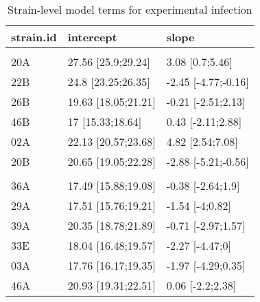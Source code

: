 \begin{table}

\caption{\label{tab:}Strain-level model terms for experimental infection}
\centering
\begin{tabular}[t]{lll}
\toprule
strain.id & intercept & slope\\
\midrule
\addlinespace[0.3em]
\multicolumn{3}{l}{\textbf{P. syringae}}\\
\hspace{1em}20A & 27.56 [25.9;29.24] & 3.08 [0.7;5.46]\\
\hspace{1em}22B & 24.8 [23.25;26.35] & -2.45 [-4.77;-0.16]\\
\hspace{1em}26B & 19.63 [18.05;21.21] & -0.21 [-2.51;2.13]\\
\hspace{1em}46B & 17 [15.33;18.64] & 0.43 [-2.11;2.88]\\
\hspace{1em}02A & 22.13 [20.57;23.68] & 4.82 [2.54;7.08]\\
\hspace{1em}20B & 20.65 [19.05;22.28] & -2.88 [-5.21;-0.56]\\
\addlinespace[0.3em]
\multicolumn{3}{l}{\textbf{P. fluorescens}}\\
\hspace{1em}36A & 17.49 [15.88;19.08] & -0.38 [-2.64;1.9]\\
\hspace{1em}29A & 17.51 [15.76;19.21] & -1.54 [-4;0.82]\\
\hspace{1em}39A & 20.35 [18.78;21.89] & -0.71 [-2.97;1.57]\\
\hspace{1em}33E & 18.04 [16.48;19.57] & -2.27 [-4.47;0]\\
\hspace{1em}03A & 17.76 [16.17;19.35] & -1.97 [-4.29;0.35]\\
\hspace{1em}46A & 20.93 [19.31;22.51] & 0.06 [-2.2;2.38]\\
\bottomrule
\end{tabular}
\end{table}